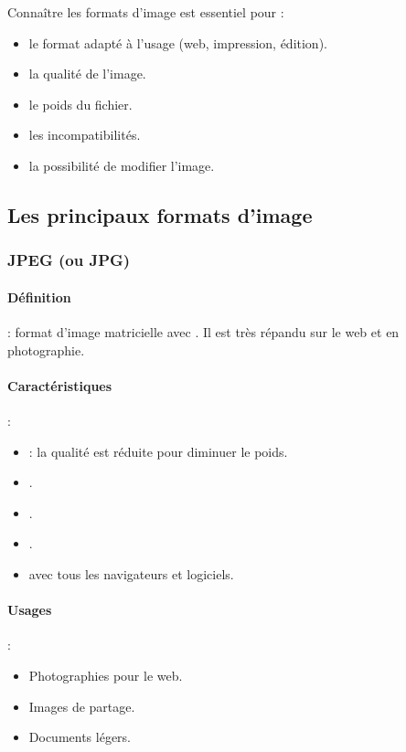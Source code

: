 Connaître les formats d'image est essentiel pour :

\begin{itemize}
    \item {} le format adapté à l'usage (web, impression, édition).
    \item {} la qualité de l'image.
    \item {} le poids du fichier.
    \item {} les incompatibilités.
    \item {} la possibilité de modifier l'image.
\end{itemize}

\subsection{Les principaux formats d'image}

\subsubsection{JPEG (ou JPG)}

\paragraph{Définition} : format d'image matricielle avec . Il est très répandu sur le web et en photographie.

\paragraph{Caractéristiques} :
\begin{itemize}
    \item {} : la qualité est réduite pour diminuer le poids.
    \item {}.
    \item {}.
    \item {}.
    \item {} avec tous les navigateurs et logiciels.
\end{itemize}

\paragraph{Usages} :
\begin{itemize}
    \item Photographies pour le web.
    \item Images de partage.
    \item Documents légers.
\end{itemize}

